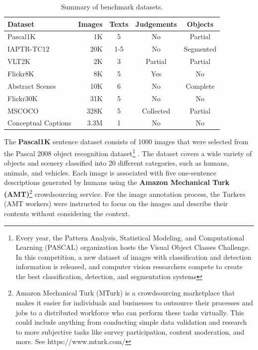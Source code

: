 \begin{table}[ht]
\centering
\caption{Summary of benchmark datasets.}
\begin{tabular}[t]{lrccc}
    \toprule
    Dataset &  Images & Texts & Judgements & Objects \\
    \midrule
    Pascal1K \citep{Rashtchian2010} & 1K  & 5 & No & Partial \\
    IAPTR-TC12 \citep{Escalante2010} & 20K  & 1-5  & No & Segmented \\
    VLT2K \citep{Elliott2013} & 2K  & 3  & Partial & Partial \\
    Flickr8K \citep{Rashtchian2010} & 8K & 5 & Yes & No \\
    Abstract Scenes \citep{Zitnick2013} & 10K & 6 & No & Complete \\
    Flickr30K \citep{Young2014} & 31K  & 5 & No & No \\
    MSCOCO \citep{Lin2014} & 328K & 5 & Collected & Partial \\
    Conceptual Captions \citep{Sharma2018}  & 3.3M  & 1  & No & No \\
    \bottomrule
\end{tabular}
\label{tab:datasets}
\end{table}

The \textbf{Pascal1K} sentence dataset \citet{Rashtchian2010} consists of 1000 images that were selected from the Pascal 2008 object recognition dataset\footnote{Every year, the Pattern Analysis, Statistical Modeling, and Computational Learning (PASCAL) organization hosts the Visual Object Classes Challenge. In this competition, a new dataset of images with classification and detection information is released, and computer vision researchers compete to create the best classification, detection, and segmentation systems} \citep{Everingham2010}. The dataset covers a wide variety of objects and scenery classified into 20 different categories, such as humans, animals, and vehicles. Each image is associated with five one-sentence descriptions generated by humans using the \textbf{Amazon Mechanical Turk (AMT)}\footnote{Amazon Mechanical Turk (MTurk) is a crowdsourcing marketplace that makes it easier for individuals and businesses to outsource their processes and jobs to a distributed workforce who can perform these tasks virtually. This could include anything from conducting simple data validation and research to more subjective tasks like survey participation, content moderation, and more. See https://www.mturk.com/ \nopagebreak} crowdsourcing service. For the image annotation process, the Turkers (AMT workers) were instructed to focus on the images and describe their contents without considering the context.

